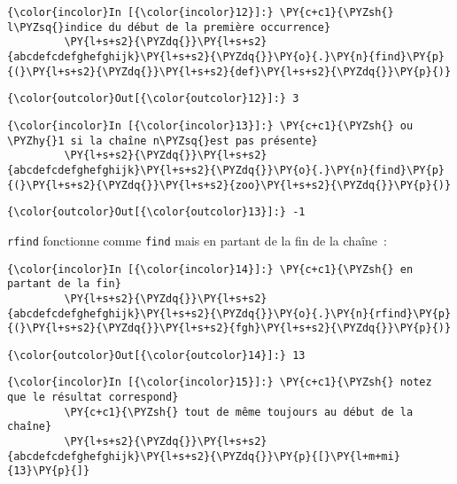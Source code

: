     \begin{Verbatim}[commandchars=\\\{\}]
{\color{incolor}In [{\color{incolor}12}]:} \PY{c+c1}{\PYZsh{} l\PYZsq{}indice du début de la première occurrence}
         \PY{l+s+s2}{\PYZdq{}}\PY{l+s+s2}{abcdefcdefghefghijk}\PY{l+s+s2}{\PYZdq{}}\PY{o}{.}\PY{n}{find}\PY{p}{(}\PY{l+s+s2}{\PYZdq{}}\PY{l+s+s2}{def}\PY{l+s+s2}{\PYZdq{}}\PY{p}{)}
\end{Verbatim}


\begin{Verbatim}[commandchars=\\\{\}]
{\color{outcolor}Out[{\color{outcolor}12}]:} 3
\end{Verbatim}
            
    \begin{Verbatim}[commandchars=\\\{\}]
{\color{incolor}In [{\color{incolor}13}]:} \PY{c+c1}{\PYZsh{} ou \PYZhy{}1 si la chaîne n\PYZsq{}est pas présente}
         \PY{l+s+s2}{\PYZdq{}}\PY{l+s+s2}{abcdefcdefghefghijk}\PY{l+s+s2}{\PYZdq{}}\PY{o}{.}\PY{n}{find}\PY{p}{(}\PY{l+s+s2}{\PYZdq{}}\PY{l+s+s2}{zoo}\PY{l+s+s2}{\PYZdq{}}\PY{p}{)}
\end{Verbatim}


\begin{Verbatim}[commandchars=\\\{\}]
{\color{outcolor}Out[{\color{outcolor}13}]:} -1
\end{Verbatim}
            
    \texttt{rfind} fonctionne comme \texttt{find} mais en partant de la fin
de la chaîne~:

    \begin{Verbatim}[commandchars=\\\{\}]
{\color{incolor}In [{\color{incolor}14}]:} \PY{c+c1}{\PYZsh{} en partant de la fin}
         \PY{l+s+s2}{\PYZdq{}}\PY{l+s+s2}{abcdefcdefghefghijk}\PY{l+s+s2}{\PYZdq{}}\PY{o}{.}\PY{n}{rfind}\PY{p}{(}\PY{l+s+s2}{\PYZdq{}}\PY{l+s+s2}{fgh}\PY{l+s+s2}{\PYZdq{}}\PY{p}{)}
\end{Verbatim}


\begin{Verbatim}[commandchars=\\\{\}]
{\color{outcolor}Out[{\color{outcolor}14}]:} 13
\end{Verbatim}
            
    \begin{Verbatim}[commandchars=\\\{\}]
{\color{incolor}In [{\color{incolor}15}]:} \PY{c+c1}{\PYZsh{} notez que le résultat correspond}
         \PY{c+c1}{\PYZsh{} tout de même toujours au début de la chaîne}
         \PY{l+s+s2}{\PYZdq{}}\PY{l+s+s2}{abcdefcdefghefghijk}\PY{l+s+s2}{\PYZdq{}}\PY{p}{[}\PY{l+m+mi}{13}\PY{p}{]}
\end{Verbatim}


